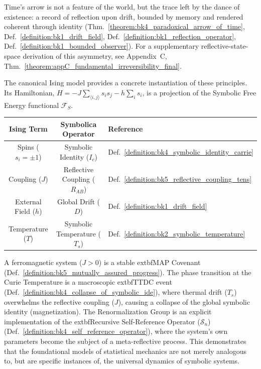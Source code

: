 \begin{scholium}
\label{scholium:bk4_irreversibility_as_trace}
Time's arrow is not a feature of the world, but the trace left by the dance of existence: a record of reflection upon drift, bounded by memory and rendered coherent through identity (Thm.~\ref{theorem:bk4_paradoxical_arrow_of_time}, Def.~\ref{definition:bk1_drift_field}, Def.~\ref{definition:bk1_reflection_operator}, Def.~\ref{definition:bk1_bounded_observer}). For a supplementary reflective-state-space derivation of this asymmetry, see Appendix~C, Thm.~\ref{theorem:appC_fundamental_irreversibility_final}.
\end{scholium}

\begin{demonstratio}
\label{demonstratio:bk4_ising_model_covenant}
The canonical Ising model provides a concrete instantiation of these principles. Its Hamiltonian, $H = -J \sum_{\langle i,j \rangle} s_i s_j - h \sum_i s_i$, is a projection of the Symbolic Free Energy functional $\mathcal{F}_S$.

\begin{center}
\begin{tabular}{|c|c|l|}
\hline
\textbf{Ising Term} & \textbf{Symbolica Operator} & \textbf{Reference} \\
\hline
Spins ($s_i = \pm 1$) & Symbolic Identity ($I_c$) & Def.~\ref{definition:bk4_symbolic_identity_carrie} \\
Coupling ($J$) & Reflective Coupling ($R_{AB}$) & Def.~\ref{definition:bk5_reflective_coupling_tens} \\
External Field ($h$) & Global Drift ($D$) & Def.~\ref{definition:bk1_drift_field} \\
Temperature ($T$) & Symbolic Temperature ($T_s$) & Def.~\ref{definition:bk2_symbolic_temperature} \\
\hline
\end{tabular}
\end{center}

A ferromagnetic system ($J>0$) is a stable 	extbf{MAP Covenant} (Def.~\ref{definition:bk5_mutually_assured_progress}). The phase transition at the Curie Temperature is a macroscopic 	extbf{TTDC event} (Def.~\ref{definition:bk4_collapse_of_symbolic_ide}), where thermal drift ($T_s$) overwhelms the reflective coupling ($J$), causing a collapse of the global symbolic identity (magnetization). The Renormalization Group is an explicit implementation of the 	extbf{Recursive Self-Reference Operator ($\mathcal{S}_n$)} (Def.~\ref{definition:bk4_self_reference_operator}), where the system's own parameters become the subject of a meta-reflective process. This demonstrates that the foundational models of statistical mechanics are not merely analogous to, but are specific instances of, the universal dynamics of symbolic systems.
\end{demonstratio}

